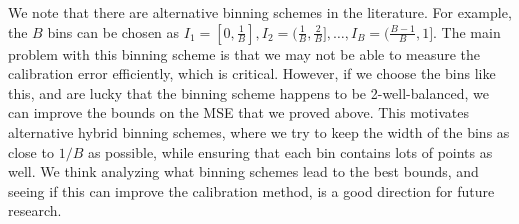 We note that there are alternative binning schemes in the literature.
For example, the $B$ bins can be chosen as $I_1 = [0, \frac{1}{B}], I_2 = (\frac{1}{B}, \frac{2}{B}], \dots, I_B = (\frac{B-1}{B}, 1]$.
The main problem with this binning scheme is that we may not be able to measure the calibration error efficiently, which is critical.
However, if we choose the bins like this, and are lucky that the binning scheme happens to be 2-well-balanced, we can improve the bounds on the MSE that we proved above.
This motivates alternative hybrid binning schemes, where we try to keep the width of the bins as close to $1/B$ as possible, while ensuring that each bin contains lots of points as well.
We think analyzing what binning schemes lead to the best bounds, and seeing if this can improve the calibration method, is a good direction for future research.

